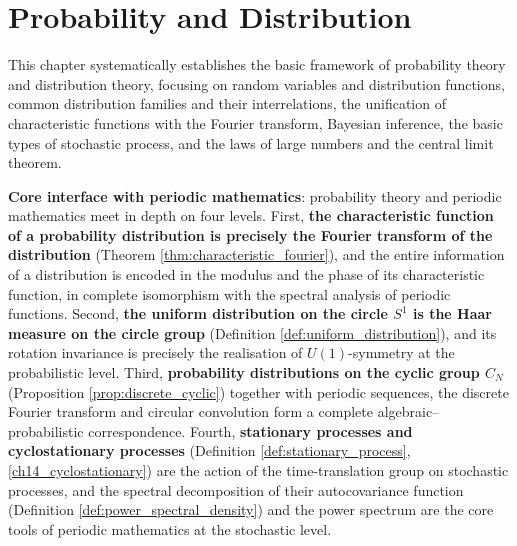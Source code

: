 \chapter{Probability and Distribution}
\label{chap:probability}

\begin{remark}\label{rem:probability_chapter_positioning}
This chapter systematically establishes the basic framework of probability theory and distribution theory, focusing on random variables and distribution functions, common distribution families and their interrelations, the unification of characteristic functions with the Fourier transform, Bayesian inference, the basic types of stochastic process, and the laws of large numbers and the central limit theorem.

\textbf{Core interface with periodic mathematics}: probability theory and periodic mathematics meet in depth on four levels. First, \textbf{the characteristic function of a probability distribution is precisely the Fourier transform of the distribution} (Theorem \ref{thm:characteristic_fourier}), and the entire information of a distribution is encoded in the modulus and the phase of its characteristic function, in complete isomorphism with the spectral analysis of periodic functions. Second, \textbf{the uniform distribution on the circle $S^1$ is the Haar measure on the circle group} (Definition \ref{def:uniform_distribution}), and its rotation invariance is precisely the realisation of $U(1)$-symmetry at the probabilistic level. Third, \textbf{probability distributions on the cyclic group $C_N$} (Proposition \ref{prop:discrete_cyclic}) together with periodic sequences, the discrete Fourier transform and circular convolution form a complete algebraic--probabilistic correspondence. Fourth, \textbf{stationary processes and cyclostationary processes} (Definition \ref{def:stationary_process}, \ref{ch14_cyclostationary}) are the action of the time-translation group on stochastic processes, and the spectral decomposition of their autocovariance function (Definition \ref{def:power_spectral_density}) and the power spectrum are the core tools of periodic mathematics at the stochastic level.


\end{remark}
